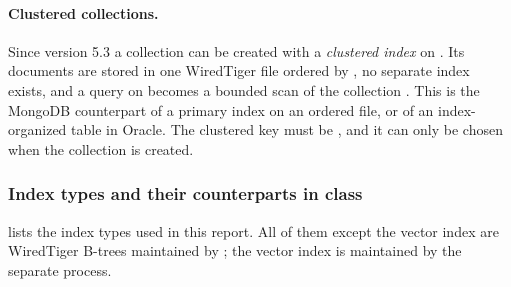 \paragraph{Clustered collections.}
Since version 5.3 a collection can be created with a \emph{clustered index} on . Its
documents are stored in one WiredTiger file ordered by , no separate  index
exists, and a query on  becomes a bounded scan of the collection \cite{mongodb-clustered}.
This is the MongoDB counterpart of a primary index on an ordered file, or of an index-organized
table in Oracle. The clustered key must be , and it can only be chosen when the collection
is created.

\subsubsection{Index types and their counterparts in class}
\label{sec:index-types}
 lists the index types used in this report. All of them except the vector index
are WiredTiger B-trees maintained by ; the vector index is maintained by the separate
 process.

